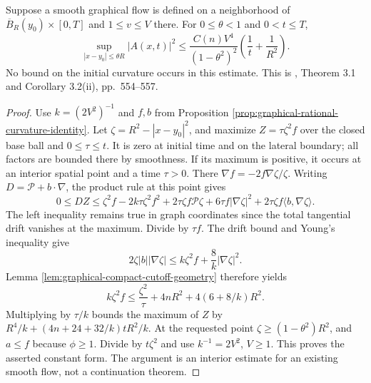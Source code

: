 \begin{theorem}\label{thm:graphical-base-interior-curvature}
Suppose a smooth graphical flow is defined on a neighborhood of $\overline B_R(y_0)\times[0,T]$ and $1\leq v\leq V$ there. For $0\leq\theta<1$ and $0<t\leq T$,
\[
 \sup_{|x-y_0|\leq\theta R}|A(x,t)|^2
 \leq\frac{C(n)V^4}{(1-\theta^2)^2}
             \left(\frac1t+\frac1{R^2}\right).
\]
No bound on the initial curvature occurs in this estimate. This is \cite{EH91}, Theorem 3.1 and Corollary 3.2(ii), pp.~554--557.
\end{theorem}
\begin{proof}
Use $k=(2V^2)^{-1}$ and $f,b$ from Proposition \ref{prop:graphical-rational-curvature-identity}. Let $\zeta=R^2-|x-y_0|^2$, and maximize $Z=\tau\zeta^2 f$ over the closed base ball and $0\leq\tau\leq t$. It is zero at initial time and on the lateral boundary; all factors are bounded there by smoothness. If its maximum is positive, it occurs at an interior spatial point and a time $\tau>0$. There $\nabla f=-2f\nabla\zeta/\zeta$. Writing $D=\mathcal P+b\cdot\nabla$, the product rule at this point gives
\[
 0\leq DZ\leq\zeta^2 f-2k\tau\zeta^2f^2
       +2\tau\zeta f\mathcal P\zeta
       +6\tau f|\nabla\zeta|^2
       +2\tau\zeta f\langle b,\nabla\zeta\rangle.
\]
The left inequality remains true in graph coordinates since the total tangential drift vanishes at the maximum. Divide by $\tau f$. The drift bound and Young's inequality give
\[
 2\zeta|b||\nabla\zeta|
 \leq k\zeta^2f+\frac8k|\nabla\zeta|^2.
\]
Lemma \ref{lem:graphical-compact-cutoff-geometry} therefore yields
\[
 k\zeta^2 f\leq\frac{\zeta^2}{\tau}
                 +4nR^2+4(6+8/k)R^2.
\]
Multiplying by $\tau/k$ bounds the maximum of $Z$ by
$R^4/k+(4n+24+32/k)tR^2/k$. At the requested point $\zeta\geq(1-\theta^2)R^2$, and $a\leq f$ because $\phi\geq1$. Divide by $t\zeta^2$ and use $k^{-1}=2V^2$, $V\geq1$. This proves the asserted constant form. The argument is an interior estimate for an existing smooth flow, not a continuation theorem.
\end{proof}

